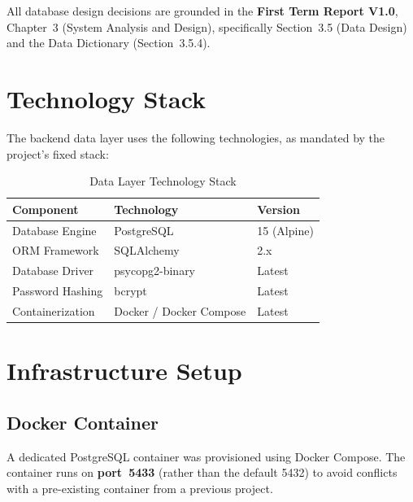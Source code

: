 \documentclass[12pt,a4paper]{article}
\begin{document}
All database design decisions are grounded in the \textbf{First Term Report V1.0}, Chapter~3 (System Analysis and Design), specifically Section~3.5 (Data Design) and the Data Dictionary (Section~3.5.4).

\section{Technology Stack}

The backend data layer uses the following technologies, as mandated by the project's fixed stack:

\begin{table}[h!]
\centering
\caption{Data Layer Technology Stack}
\begin{tabular}{@{}lll@{}}
\toprule
\textbf{Component}   & \textbf{Technology}      & \textbf{Version} \\ \midrule
Database Engine       & PostgreSQL               & 15 (Alpine)      \\
ORM Framework         & SQLAlchemy               & 2.x              \\
Database Driver       & psycopg2-binary          & Latest           \\
Password Hashing      & bcrypt                   & Latest           \\
Containerization      & Docker / Docker Compose  & Latest           \\
\bottomrule
\end{tabular}
\end{table}

\section{Infrastructure Setup}

\subsection{Docker Container}

A dedicated PostgreSQL container was provisioned using Docker Compose. The container runs on \textbf{port~5433} (rather than the default 5432) to avoid conflicts with a pre-existing container from a previous project.
\end{document}
